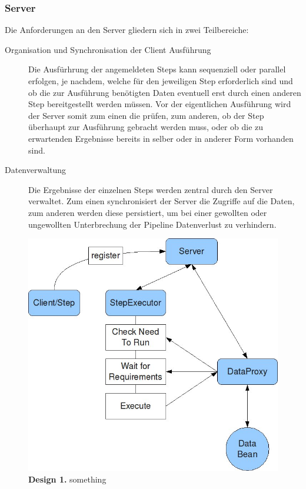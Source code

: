 \subsubsection{Server}
Die Anforderungen an den Server gliedern sich in zwei Teilbereiche:
\begin{description}
\item[Organisation und Synchronisation der Client Ausführung]
Die Ausfürhrung der angemeldeten Steps kann sequenziell oder
parallel erfolgen, je nachdem, welche  für den
jeweiligen Step erforderlich sind und ob die zur Ausführung benötigten Daten eventuell erst
durch einen anderen Step bereitgestellt werden müssen. Vor der eigentlichen
Ausführung wird der Server somit zum einen die 
prüfen, zum anderen, ob der Step überhaupt zur Ausführung
gebracht werden muss, oder ob die zu erwartenden Ergebnisse bereits in selber
oder in anderer Form vorhanden sind.
\item[Datenverwaltung] Die Ergebnisse der einzelnen Steps werden zentral durch
den Server verwaltet.
Zum einen synchronisiert der Server die Zugriffe auf die Daten, zum anderen
werden diese persistiert, um bei einer gewollten oder ungewollten Unterbrechung
der Pipeline Datenverlust zu verhindern.
\end{description}

\begin{figure}[htbp]
	\begin{center}
		\includegraphics[scale=0.6]{pics/programOrganisationOverview3ScaledWithAlpha.jpg}
	\caption[Design 1]{
	\textbf{Design 1.}
	something}
	\end{center}
	\label{fig:programOrganisationOverview3ScaledWithAlpha}
\end{figure}

